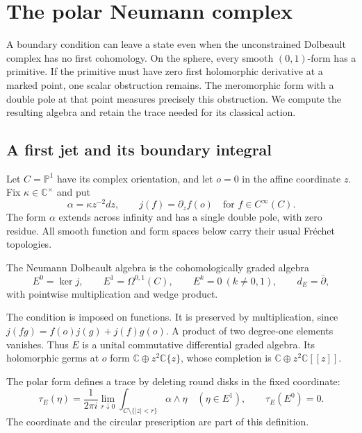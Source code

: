 \chapter{The polar Neumann complex}
\label{mht:ch:polar-neumann}

A boundary condition can leave a state even when the unconstrained
Dolbeault complex has no first cohomology. On the sphere, every smooth
$(0,1)$-form has a primitive. If the primitive must have zero first
holomorphic derivative at a marked point, one scalar obstruction remains.
The meromorphic form with a double pole at that point measures precisely
this obstruction. We compute the resulting algebra and retain the trace
needed for its classical action.

\section{A first jet and its boundary integral}

Let $C=\mathbb P^1$ have its complex orientation, and let $o=0$ in the
affine coordinate $z$. Fix $\kappa\in\mathbb C^\times$ and put
\[
 \alpha=\kappa z^{-2}dz,\qquad j(f)=\partial_z f(o)
 \quad\text{for }f\in C^\infty(C).
\]
The form $\alpha$ extends across infinity and has a single double pole,
with zero residue. All smooth function and form spaces below carry their
usual Fr\'echet topologies.

\begin{definition}\label{mht:def:neumann-algebra}
The Neumann Dolbeault algebra is the cohomologically graded algebra
\[
 E^0=\ker j,\qquad E^1=\Omega^{0,1}(C),\qquad
 E^k=0\ (k\ne0,1),\qquad d_E=\bar\partial,
\]
with pointwise multiplication and wedge product.
\end{definition}

The condition is imposed on functions. It is preserved by multiplication,
since $j(fg)=f(o)j(g)+j(f)g(o)$. A product of two degree-one elements
vanishes. Thus $E$ is a unital commutative differential graded algebra.
Its holomorphic germs at $o$ form
$\mathbb C\oplus z^2\mathbb C\{z\}$, whose completion is
$\mathbb C\oplus z^2\mathbb C[[z]]$.

The polar form defines a trace by deleting round disks in the fixed
coordinate:
\begin{equation}\label{mht:eq:polar-trace}
 \tau_E(\eta)=\frac1{2\pi i}
   \lim_{r\downarrow0}\int_{C\setminus\{|z|<r\}}\alpha\wedge\eta
 \quad(\eta\in E^1),\qquad \tau_E(E^0)=0.
\end{equation}
The coordinate and the circular prescription are part of this definition.

